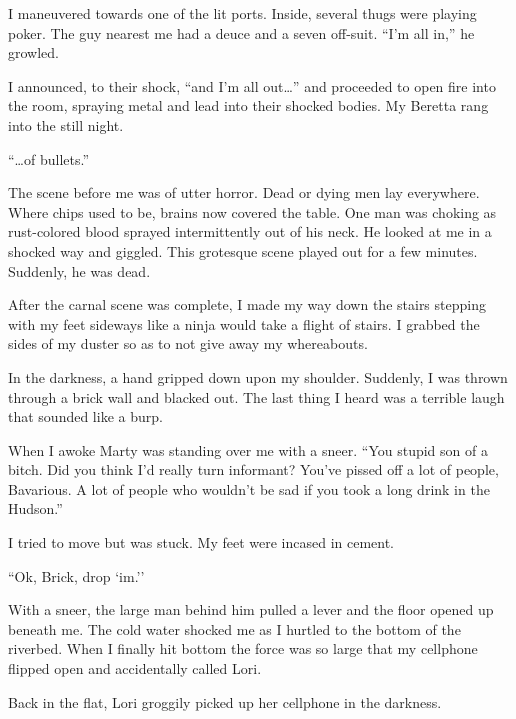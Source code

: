 I maneuvered towards one of the lit ports. Inside, several thugs
were playing poker. The guy nearest me had a deuce and a seven
off-suit. ``I'm all in,'' he growled.



I announced, to their shock, ``and I'm all
out{\ldots}'' and proceeded to open fire into the room,
spraying metal and lead into their shocked bodies. My Beretta rang
into the still night.



``{\ldots}of bullets.''



The scene before me was of utter horror. Dead or dying men lay
everywhere. Where chips used to be, brains now covered the table.
One man was choking as rust-colored blood sprayed intermittently
out of his neck. He looked at me in a shocked way and giggled. This
grotesque scene played out for a few minutes. Suddenly, he was
dead.



After the carnal scene was complete, I made my way down the stairs
stepping with my feet sideways like a ninja would take a flight of
stairs. I grabbed the sides of my duster so as to not give away my
whereabouts.



In the darkness, a hand gripped down upon my shoulder. Suddenly, I
was thrown through a brick wall and blacked out. The last thing I
heard was a terrible laugh that sounded like a burp.



When I awoke Marty was standing over me with a sneer. ``You
stupid son of a bitch. Did you think I'd really turn
informant? You've pissed off a lot of people, Bavarious. A
lot of people who wouldn't be sad if you took a long drink in
the Hudson.''



I tried to move but was stuck. My feet were incased in
cement.



``Ok, Brick, drop `im.''



With a sneer, the large man behind him pulled a lever and the floor
opened up beneath me. The cold water shocked me as I hurtled to the
bottom of the riverbed. When I finally hit bottom the force was so
large that my cellphone flipped open and accidentally called
Lori.



Back in the flat, Lori groggily picked up her cellphone in the
darkness.



